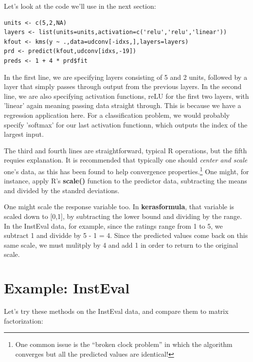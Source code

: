Let's look at the code we'll use in the next section:

\begin{lstlisting}
units <- c(5,2,NA)
layers <- list(units=units,activation=c('relu','relu','linear')) 
kfout <- kms(y ~ .,data=udconv[-idxs,],layers=layers) 
prd <- predict(kfout,udconv[idxs,-19]) 
preds <- 1 + 4 * prd$fit
\end{lstlisting}

In the first line, we are specifying layers consisting of 5 and 2 units,
followed by a layer that simply passes through output from the previous
layers.  In the second line, we are also specifying activation
functions, reLU for the first two layers, with 'linear' again meaning
passing data straight through.  This is because we have a regression
application here.  For a classification problem, we would probably
specify 'softmax' for our last activation functionn, which outputs the
index of the largest input.

The third and fourth lines are straightforward, typical R operations,
but the fifth requies explanation.  It is recommended that
typically one should \textit{center and scale} one's data, as this has
been found to help convergence properties.\footnote{One common issue is
the ``broken clock problem'' in which the algorithm converges but all
the predicted values are identical!}  One might, for instance, apply R's
\textbf{scale()} function to the predictor data, subtracting the means
and divided by the standrd deviations.

One might scale the response variable too.  In \textbf{kerasformula},
that variable is scaled down to [0,1], by subtracting the lower bound
and dividing by the range.  In the InstEval data, for example, since the
ratings range from 1 to 5, we subtract 1 and dividde by 5 - 1 = 4.
Since the predicted values come back on this same scale, we must
mulitply by 4 and add 1 in order to return to the original scale.


\section{Example: InstEval}

Let's try these methods on the InstEval data, and compare them to matrix
factorization:

